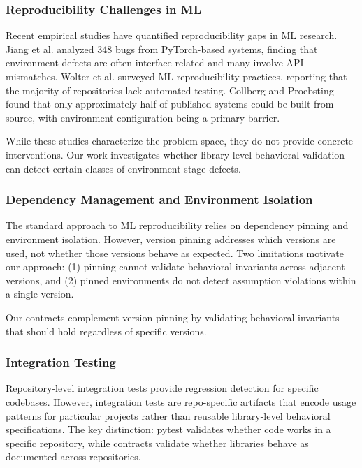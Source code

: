 
\subsubsection{Reproducibility Challenges in ML}

Recent empirical studies have quantified reproducibility gaps in ML research. Jiang et al. analyzed 348 bugs from PyTorch-based systems, finding that environment defects are often interface-related and many involve API mismatches. Wolter et al. surveyed ML reproducibility practices, reporting that the majority of repositories lack automated testing. Collberg and Proebsting found that only approximately half of published systems could be built from source, with environment configuration being a primary barrier.

While these studies characterize the problem space, they do not provide concrete interventions. Our work investigates whether library-level behavioral validation can detect certain classes of environment-stage defects.

\subsubsection{Dependency Management and Environment Isolation}

The standard approach to ML reproducibility relies on dependency pinning and environment isolation. However, version pinning addresses which versions are used, not whether those versions behave as expected. Two limitations motivate our approach: (1) pinning cannot validate behavioral invariants across adjacent versions, and (2) pinned environments do not detect assumption violations within a single version.

Our contracts complement version pinning by validating behavioral invariants that should hold regardless of specific versions.

\subsubsection{Integration Testing}

Repository-level integration tests provide regression detection for specific codebases. However, integration tests are repo-specific artifacts that encode usage patterns for particular projects rather than reusable library-level behavioral specifications. The key distinction: pytest validates whether code works in a specific repository, while contracts validate whether libraries behave as documented across repositories.

